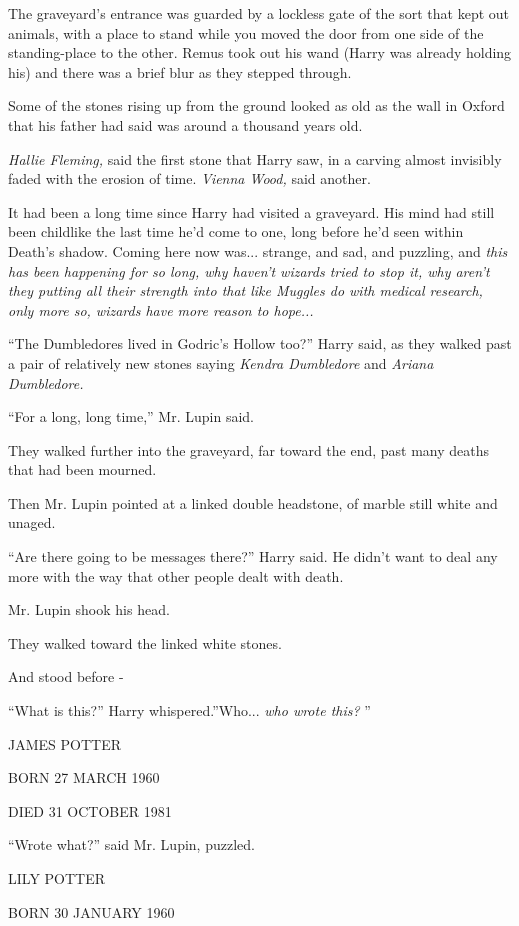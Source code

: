 The graveyard's entrance was guarded by a lockless gate of the sort that
kept out animals, with a place to stand while you moved the door from
one side of the standing-place to the other. Remus took out his wand
(Harry was already holding his) and there was a brief blur as they
stepped through.

Some of the stones rising up from the ground looked as old as the wall
in Oxford that his father had said was around a thousand years old.

\emph{Hallie Fleming,} said the first stone that Harry saw, in a carving
almost invisibly faded with the erosion of time. \emph{Vienna Wood,}
said another.

It had been a long time since Harry had visited a graveyard. His mind
had still been childlike the last time he'd come to one, long before
he'd seen within Death's shadow. Coming here now was... strange,
and sad, and puzzling, and \emph{this has been happening for so long,
why haven't wizards tried to stop it, why aren't they putting all their
strength into that like Muggles do with medical research, only more so,
wizards have more reason to hope...}

``The Dumbledores lived in Godric's Hollow too?'' Harry said, as they
walked past a pair of relatively new stones saying \emph{Kendra
Dumbledore} and \emph{Ariana Dumbledore.}

``For a long, long time,'' Mr. Lupin said.

They walked further into the graveyard, far toward the end, past many
deaths that had been mourned.

Then Mr. Lupin pointed at a linked double headstone, of marble still
white and unaged.

``Are there going to be messages there?'' Harry said. He didn't want to
deal any more with the way that other people dealt with death.

Mr. Lupin shook his head.

They walked toward the linked white stones.

And stood before -

``What is this?'' Harry whispered.''Who... \emph{who wrote this?} ''

JAMES POTTER

BORN 27 MARCH 1960

DIED 31 OCTOBER 1981

``Wrote what?'' said Mr. Lupin, puzzled.

LILY POTTER

BORN 30 JANUARY 1960

